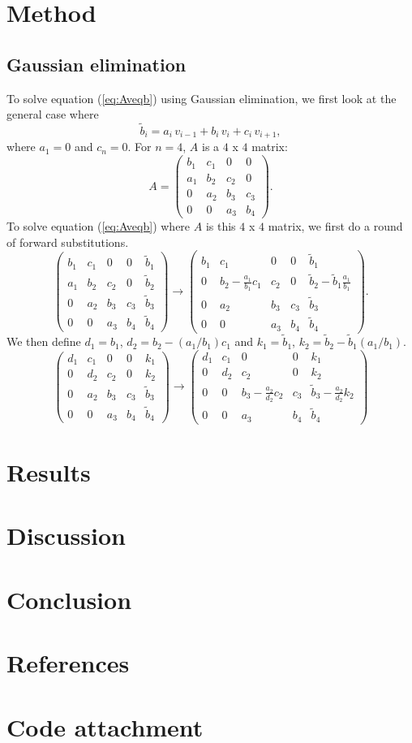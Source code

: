 \documentclass[norsk,a4paper,12pt]{article}
\begin{document}
\section{Method}
\subsection{Gaussian elimination}
To solve equation (\ref{eq:Aveqb}) using Gaussian elimination, we first look at the general case where $$\tilde{
b}_i = a_i\,v_{i-1} + b_i\,v_i + c_i\,v_{i+1},$$ where $a_1=0$ and $c_n=0$.
For $n=4$, $A$ is a $4$ x $4$ matrix:
$$A = \begin{pmatrix}
b_1&c_1&0&0\\
a_1&b_2&c_2&0\\
0&a_2&b_3&c_3\\
0&0&a_3&b_4
\end{pmatrix}.
$$
To solve equation (\ref{eq:Aveqb}) where $A$ is this $4$ x $4$ matrix, we first do a round of forward substitutions.
$$\begin{pmatrix}
b_1&c_1&0&0&\tilde{b}_1\\
a_1&b_2&c_2&0&\tilde{b}_2\\
0&a_2&b_3&c_3&\tilde{b}_3\\
0&0&a_3&b_4&\tilde{b}_4
\end{pmatrix} \rightarrow \begin{pmatrix}
b_1&c_1&0&0&\tilde{b}_1\\
0&b_2-\frac{a_1}{b_1}c_1&c_2&0&\tilde{b}_2-\tilde{b}_1\frac{a_1}{b_1}\\
0&a_2&b_3&c_3&\tilde{b}_3\\
0&0&a_3&b_4&\tilde{b}_4
\end{pmatrix}.$$
We then define $d_1=b_1$, $d_2=b_2-(a_1/b_1)c_1$ and $k_1=\tilde{b}_1$, $k_2=\tilde{b}_2-\tilde{b}_1(a_1/b_1)$. 
$$\begin{pmatrix}
d_1&c_1&0&0&k_1\\
0&d_2&c_2&0&k_2\\
0&a_2&b_3&c_3&\tilde{b}_3\\
0&0&a_3&b_4&\tilde{b}_4
\end{pmatrix} \rightarrow \begin{pmatrix}
d_1&c_1&0&0&k_1\\
0&d_2&c_2&0&k_2\\
0&0&b_3-\frac{a_2}{d_2}c_2&c_3&\tilde{b}_3-\frac{a_2}{d_2}k_2\\
0&0&a_3&b_4&\tilde{b}_4
\end{pmatrix}$$
\section{Results}
\section{Discussion}
\section{Conclusion}
\section{References}
\section{Code attachment}
\end{document}
